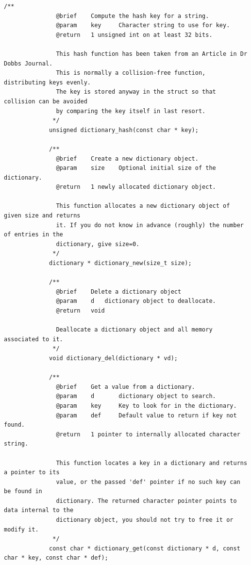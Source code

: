\documentclass{article}
\begin{document}
\begin{Verbatim}[gobble=8]
             /**
               @brief    Compute the hash key for a string.
               @param    key     Character string to use for key.
               @return   1 unsigned int on at least 32 bits.
             
               This hash function has been taken from an Article in Dr Dobbs Journal.
               This is normally a collision-free function, distributing keys evenly.
               The key is stored anyway in the struct so that collision can be avoided
               by comparing the key itself in last resort.
              */
             unsigned dictionary_hash(const char * key);
             
             /**
               @brief    Create a new dictionary object.
               @param    size    Optional initial size of the dictionary.
               @return   1 newly allocated dictionary object.
             
               This function allocates a new dictionary object of given size and returns
               it. If you do not know in advance (roughly) the number of entries in the
               dictionary, give size=0.
              */
             dictionary * dictionary_new(size_t size);
             
             /**
               @brief    Delete a dictionary object
               @param    d   dictionary object to deallocate.
               @return   void
             
               Deallocate a dictionary object and all memory associated to it.
              */
             void dictionary_del(dictionary * vd);
             
             /**
               @brief    Get a value from a dictionary.
               @param    d       dictionary object to search.
               @param    key     Key to look for in the dictionary.
               @param    def     Default value to return if key not found.
               @return   1 pointer to internally allocated character string.
             
               This function locates a key in a dictionary and returns a pointer to its
               value, or the passed 'def' pointer if no such key can be found in
               dictionary. The returned character pointer points to data internal to the
               dictionary object, you should not try to free it or modify it.
              */
             const char * dictionary_get(const dictionary * d, const char * key, const char * def);
             

\end{Verbatim}
\end{document}

